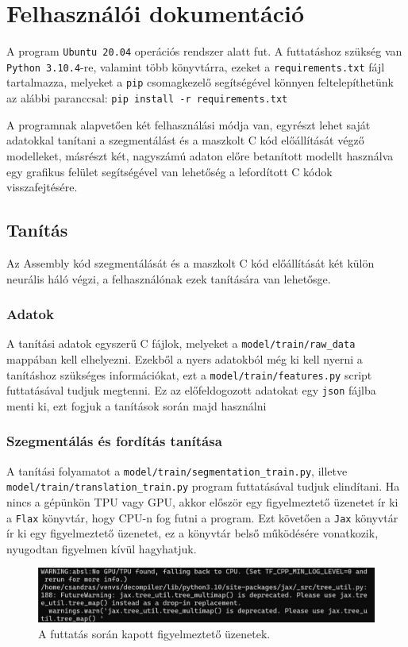 \chapter{Felhasználói dokumentáció}
\label{ch:user}

A program \texttt{Ubuntu 20.04} operációs rendszer alatt fut.
A futtatáshoz szükség van \texttt{Python 3.10.4}-re, valamint több könyvtárra,
ezeket a \texttt{requirements.txt} fájl tartalmazza, melyeket a
\texttt{pip} csomagkezelő segítségével könnyen feltelepíthetünk az alábbi
paranccsal: \texttt{pip install -r requirements.txt}

A programnak alapvetően két felhasználási módja van, egyrészt lehet saját
adatokkal tanítani a szegmentálást és a maszkolt C kód előállítását végző
modelleket, másrészt két, nagyszámú adaton előre betanított modellt használva
egy grafikus felület segítségével van lehetőség a lefordított C kódok
visszafejtésére.

\section{Tanítás}
Az Assembly kód szegmentálását és a maszkolt C kód előállítását két külön
neurális háló végzi, a felhasználónak ezek tanítására van lehetősge.
\subsection{Adatok}
A tanítási adatok egyszerű C fájlok, melyeket a \texttt{model/train/raw\_data}
mappában kell elhelyezni. Ezekből a nyers adatokból még ki kell nyerni
a tanításhoz szükséges információkat, ezt a \texttt{model/train/features.py}
script futtatásával tudjuk megtenni. Ez az előfeldogozott adatokat egy
\texttt{json} fájlba menti ki, ezt fogjuk a tanítások során majd használni

\subsection{Szegmentálás és fordítás tanítása}
A tanítási folyamatot a \texttt{model/train/segmentation\_train.py}, illetve
\texttt{model/train/translation\_train.py} program
futtatásával tudjuk elindítani. Ha nincs a gépünkön TPU vagy GPU, akkor először
egy figyelmeztető üzenetet ír ki a \texttt{Flax} könyvtár, hogy CPU-n fog futni
a program. Ezt követően a \texttt{Jax} könyvtár ír ki egy figyelmeztető
üzenetet, ez a könyvtár belső működésére vonatkozik, nyugodtan figyelmen kívül
hagyhatjuk.

\begin{figure}[H]
	\centering
	\includegraphics[width=1.0\textwidth]{images/warnings.png}
	\caption{A futtatás során kapott figyelmeztető üzenetek.}
	\label{fig:warnings}
\end{figure}

